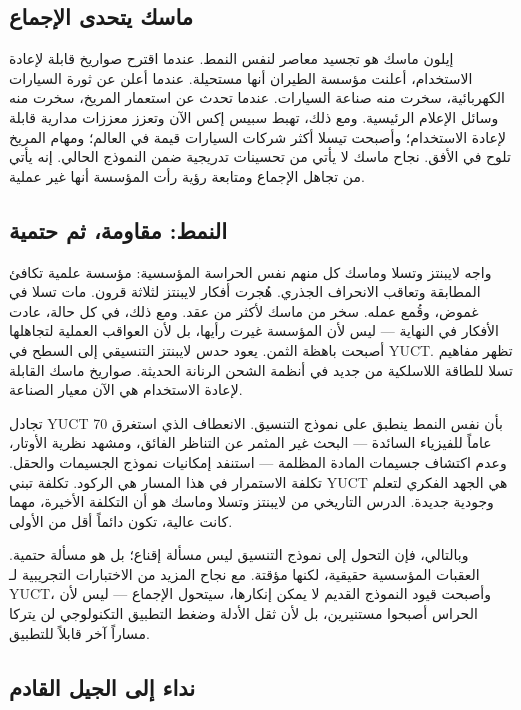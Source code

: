 \documentclass[12pt,a4paper]{article}
\begin{document}
	\subsection{ماسك يتحدى الإجماع}
	
	إيلون ماسك هو تجسيد معاصر لنفس النمط. عندما اقترح صواريخ قابلة لإعادة الاستخدام، أعلنت مؤسسة الطيران أنها مستحيلة. عندما أعلن عن ثورة السيارات الكهربائية، سخرت منه صناعة السيارات. عندما تحدث عن استعمار المريخ، سخرت منه وسائل الإعلام الرئيسية. ومع ذلك، تهبط سبيس إكس الآن وتعزز معززات مدارية قابلة لإعادة الاستخدام؛ وأصبحت تيسلا أكثر شركات السيارات قيمة في العالم؛ ومهام المريخ تلوح في الأفق. نجاح ماسك لا يأتي من تحسينات تدريجية ضمن النموذج الحالي. إنه يأتي من تجاهل الإجماع ومتابعة رؤية رأت المؤسسة أنها غير عملية.
	
	\subsection{النمط: مقاومة، ثم حتمية}
	
	واجه لايبنتز وتسلا وماسك كل منهم نفس الحراسة المؤسسية: مؤسسة علمية تكافئ المطابقة وتعاقب الانحراف الجذري. هُجرت أفكار لايبنتز لثلاثة قرون. مات تسلا في غموض، وقُمع عمله. سخر من ماسك لأكثر من عقد. ومع ذلك، في كل حالة، عادت الأفكار في النهاية — ليس لأن المؤسسة غيرت رأيها، بل لأن العواقب العملية لتجاهلها أصبحت باهظة الثمن. يعود حدس لايبنتز التنسيقي إلى السطح في YUCT. تظهر مفاهيم تسلا للطاقة اللاسلكية من جديد في أنظمة الشحن الرنانة الحديثة. صواريخ ماسك القابلة لإعادة الاستخدام هي الآن معيار الصناعة.
	
	تجادل YUCT بأن نفس النمط ينطبق على نموذج التنسيق. الانعطاف الذي استغرق 70 عاماً للفيزياء السائدة — البحث غير المثمر عن التناظر الفائق، ومشهد نظرية الأوتار، وعدم اكتشاف جسيمات المادة المظلمة — استنفد إمكانيات نموذج الجسيمات والحقل. تكلفة الاستمرار في هذا المسار هي الركود. تكلفة تبني YUCT هي الجهد الفكري لتعلم وجودية جديدة. الدرس التاريخي من لايبنتز وتسلا وماسك هو أن التكلفة الأخيرة، مهما كانت عالية، تكون دائماً أقل من الأولى.
	
	وبالتالي، فإن التحول إلى نموذج التنسيق ليس مسألة إقناع؛ بل هو مسألة حتمية. العقبات المؤسسية حقيقية، لكنها مؤقتة. مع نجاح المزيد من الاختبارات التجريبية لـ YUCT، وأصبحت قيود النموذج القديم لا يمكن إنكارها، سيتحول الإجماع — ليس لأن الحراس أصبحوا مستنيرين، بل لأن ثقل الأدلة وضغط التطبيق التكنولوجي لن يتركا مساراً آخر قابلاً للتطبيق.
	
	\subsection{نداء إلى الجيل القادم}
	
\end{document}
